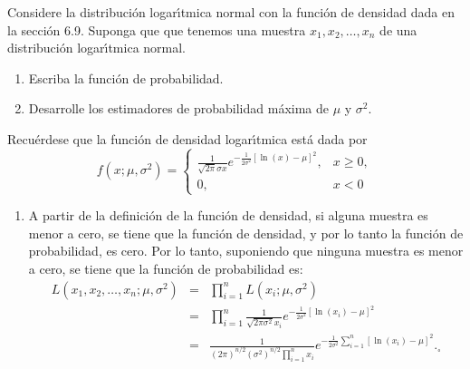 \begin{enunciado}
 Considere la distribuci\'on logar\'{\i}tmica normal con la funci\'on de densidad dada en la secci\'on 6.9. Suponga que que tenemos una muestra $x_1, x_2, \ldots, x_n$ de una distribuci\'on logar\'{\i}tmica normal.
 \begin{enumerate}
  \item Escriba la funci\'on de probabilidad.
  \item Desarrolle los estimadores de probabilidad m\'axima de $\mu$ y $\sigma^2$.
 \end{enumerate}
\end{enunciado}

\begin{solucion}
 Recu\'erdese que la funci\'on de densidad logar\'{\i}tmica est\'a dada por
 \begin{equation*}
  f(x;\mu,\sigma^2) =
  \begin{cases}
   \frac{1}{\sqrt{2\pi}\sigma x}e^{-\frac{1}{2\sigma^2}\left[ \ln(x) - \mu \right]^2}, & x \geq 0, \\
   0, & x < 0
  \end{cases}
 \end{equation*}
 
 \begin{enumerate}
  \item A partir de la definici\'on de la funci\'on de densidad, si alguna muestra es menor a cero, se tiene que la funci\'on de densidad, y por lo tanto la funci\'on de probabilidad, es cero. Por lo tanto, suponiendo que ninguna muestra es menor a cero, se tiene que la funci\'on de probabilidad es:
  \begin{eqnarray*}
   L\left( x_1, x_2, \ldots, x_n; \mu, \sigma^2 \right) & = & \prod_{i=1}^n L\left( x_i; \mu, \sigma^2 \right) \\
   & = & \prod_{i=1}^n \frac{1}{\sqrt{2\pi \sigma^2} x_i}e^{-\frac{1}{2\sigma^2}\left[ \ln\left(x_i\right) - \mu \right]^2} \\
   & = & \frac{1}{(2\pi)^{n/2}\left( \sigma^2 \right)^{n/2} \prod_{i=1}^n x_i} e^{-\frac{1}{2\sigma^2} \sum_{i=1}^n \left[ \ln\left( x_i \right) - \mu \right]^2}._{\square}
  \end{eqnarray*}
  

\end{enumerate}
\end{solucion}
